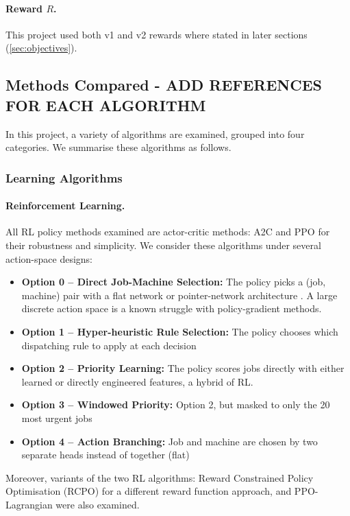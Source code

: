 \documentclass[12pt]{article}
\begin{document}
\paragraph{Reward $R$.} This project used both v1 and v2 rewards where stated in later sections (\cref{sec:objectives}).







\subsection{Methods Compared - ADD REFERENCES FOR EACH ALGORITHM}
In this project, a variety of algorithms are examined, grouped into four categories. We summarise these algorithms as follows. 

\subsubsection{Learning Algorithms}
\paragraph{Reinforcement Learning.} All RL policy methods examined are actor-critic methods: A2C and PPO for their robustness and simplicity. We consider these algorithms under several action-space designs:
\begin{itemize}
    \item \textbf{Option 0 -- Direct Job-Machine Selection:} The policy picks a (job, machine) pair with a flat network or pointer-network architecture \cite{vinyals2015pointernet, kool2019attention}. A large discrete action space is a known struggle with policy-gradient methods.
    \item \textbf{Option 1 -- Hyper-heuristic Rule Selection:} The policy chooses which dispatching rule to apply at each decision \cite{burke2013hyperheuristicsurvey, lassoued2026hyperheuristic}
    \item \textbf{Option 2 -- Priority Learning:} The policy scores jobs directly with either learned or directly engineered features, a hybrid of RL.
    \item \textbf{Option 3 -- Windowed Priority:} Option 2, but masked to only the 20 most urgent jobs \cite{mao2016deeprm}
    \item \textbf{Option 4 -- Action Branching:} Job and machine are chosen by two separate heads instead of together (flat) \cite{tavakoli2018actionbranching}
\end{itemize}
Moreover, variants of the two RL algorithms: Reward Constrained Policy Optimisation (RCPO) for a different reward function approach, and PPO-Lagrangian were also examined.
\end{document}
